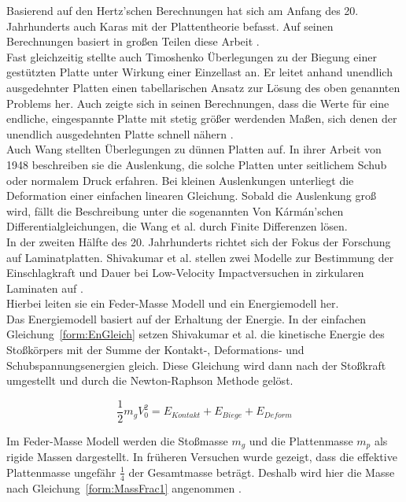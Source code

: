 Basierend auf den Hertz'schen Berechnungen hat sich am Anfang des 20. Jahrhunderts auch Karas mit der Plattentheorie befasst. Auf seinen Berechnungen basiert in großen Teilen diese Arbeit \cite{Karas.1939}.\\
Fast gleichzeitig stellte auch Timoshenko Überlegungen zu der Biegung einer gestützten Platte unter Wirkung einer Einzellast an. Er leitet anhand unendlich ausgedehnter Platten einen tabellarischen Ansatz zur Lösung des oben genannten Problems her. Auch zeigte sich in seinen Berechnungen, dass die Werte für eine endliche, eingespannte Platte mit stetig größer werdenden Maßen, sich denen der unendlich ausgedehnten Platte schnell nähern \cite{Timoshenko.1922}.\\
Auch Wang \cite{Wang.1947} stellten Überlegungen zu dünnen Platten auf. In ihrer Arbeit von 1948 beschreiben sie die Auslenkung, die solche Platten unter seitlichem Schub oder normalem Druck erfahren. Bei kleinen Auslenkungen unterliegt die Deformation einer einfachen linearen Gleichung. Sobald die Auslenkung groß wird, fällt die Beschreibung unter die sogenannten Von Kármán'schen Differentialgleichungen, die Wang et al. durch Finite Differenzen lösen.\\
In der zweiten Hälfte des 20. Jahrhunderts richtet sich der Fokus der Forschung auf Laminatplatten. Shivakumar et al. stellen zwei Modelle zur Bestimmung der Einschlagkraft und Dauer bei Low-Velocity Impactversuchen in zirkularen Laminaten auf \cite{Shivakumar.1985}. \\
Hierbei leiten sie ein Feder-Masse Modell und ein Energiemodell her. \\
Das Energiemodell basiert auf der Erhaltung der Energie. In der einfachen Gleichung~\ref{form:EnGleich} setzen Shivakumar et al. die kinetische Energie des Stoßkörpers mit der Summe der Kontakt-, Deformations- und Schubspannungsenergien gleich. Diese Gleichung wird dann nach der Stoßkraft umgestellt und durch die Newton-Raphson Methode gelöst.

\begin{equation}
	\label{form:EnGleich}
	\frac{1}{2} m_{g} V_{0}^{2} = E_{Kontakt} + E_{Biege} + E_{Deform}
\end{equation}

Im Feder-Masse Modell werden die Stoßmasse $m_g$ und die Plattenmasse $m_p$ als rigide Massen dargestellt. In früheren Versuchen wurde gezeigt, dass die effektive Plattenmasse ungefähr $\frac{1}{4}$ der Gesamtmasse beträgt. Deshalb wird hier die Masse nach Gleichung~\ref{form:MassFrac1} angenommen \cite{Shivakumar.1985}. 

